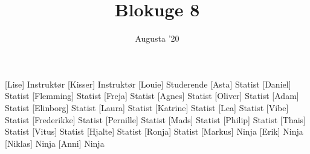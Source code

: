 \documentclass[a4paper,11pt]{article}
\title{Blokuge 8}
\author{Augusta '20}
\begin{document}
\maketitle

\begin{roles}
[Lise] Instruktør
[Kisser] Instruktør
[Louie] Studerende
[Asta] Statist
[Daniel] Statist
[Flemming] Statist
[Freja] Statist
[Agnes] Statist
[Oliver] Statist
[Adam] Statist
[Elinborg] Statist
[Laura] Statist
[Katrine] Statist
[Lea] Statist
[Vibe] Statist
[Frederikke] Statist
[Pernille] Statist
[Mads] Statist
[Philip] Statist
[Thais] Statist
[Vitus] Statist
[Hjalte] Statist
[Ronja] Statist
[Markus] Ninja
[Erik] Ninja
[Niklas] Ninja
[Anni] Ninja
\end{roles}
\end{document}
